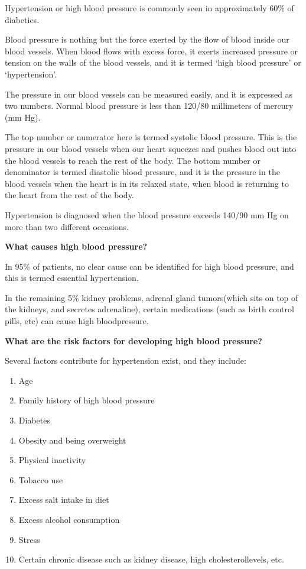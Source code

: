Hypertension or high blood pressure is commonly seen in approximately 60\% of diabetics.

Blood pressure is nothing but the force exerted by the flow of blood inside our blood vessels. When blood flows with excess force, it exerts increased pressure or tension on the walls of the blood vessels, and it is termed ‘high blood pressure’ or ‘hypertension’.

The pressure in our blood vessels can be measured easily, and it is expressed as two numbers. Normal blood pressure is less than 120/80 millimeters of mercury (mm Hg).

The top number or numerator here is termed systolic blood pre\-ssure. This is the pressure in our blood vessels when our heart squeezes and pushes blood out into the blood vessels to reach the rest of the body. The bottom number or denominator is termed diastolic blood pre\-ssure, and it is the pressure in the blood vessels when the heart is in its relaxed state, when blood is returning to the heart from the rest of the body.

Hypertension is diagnosed when the blood pressure exceeds 140/90 mm Hg on more than two different occasions.

\vskip 10pt
\noindent\textbf{What causes high blood pressure?}

In 95\% of patients, no clear cause can be identified for high blood pressure, and this is termed essential hypertension.

In the remaining 5\% kidney problems, adrenal gland tumors\break (which sits on top of the kidneys, and secretes adrenaline), certain medications (such as birth control pills, etc) can cause high blood\break pressure.

\vskip 10pt
\noindent\textbf{What are the risk factors for developing high blood pressure?}

\noindent Several factors contribute for hypertension exist, and they include:
\begin{enumerate}[•]
\itemsep=0pt
\item Age
\item Family history of high blood pressure
\item Diabetes
\item Obesity and being overweight
\item Physical inactivity
\item Tobacco use
\item Excess salt intake in diet
\item Excess alcohol consumption
\item Stress
\item Certain chronic disease such as kidney disease, high cholesterol\break levels, etc.
\end{enumerate}

